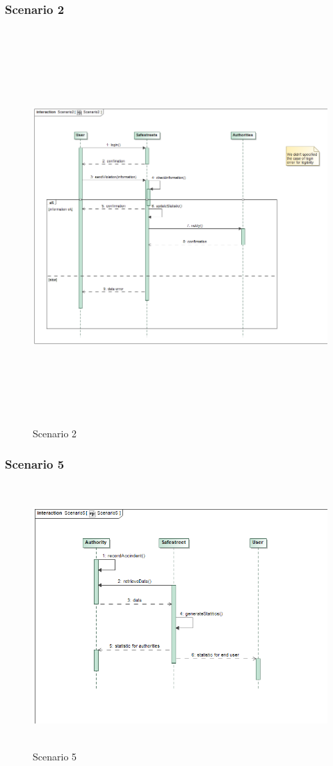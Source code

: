 \subsubsection{Scenario 2}
	\begin{figure}[H]
	\begin{minipage}[b]{0.40\textwidth}
		\includegraphics[width=18cm,height=15cm]{Images/SequenceRASD/Scenario2.png}
		\caption{Scenario 2}
	\end{minipage}
\end{figure}
\newpage
\subsubsection{Scenario 5}
\begin{figure}[H]
	\begin{minipage}[b]{0.40\textwidth}
		\includegraphics[width=15cm,height=10cm]{Images/SequenceRASD/Scenario5.png}
		\caption{Scenario 5}
	\end{minipage}
\end{figure}
